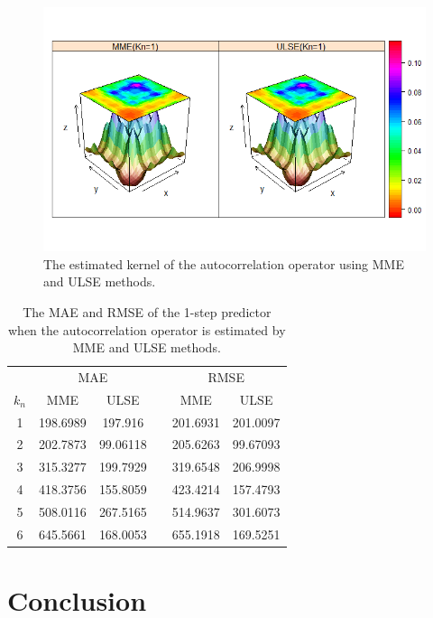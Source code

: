 \documentclass[11pt,a4paper]{article}
\numberwithin{equation}{section}
\begin{document}
\begin{figure}
\centering
\includegraphics[width=\textwidth]{images/kernel_Flinders.png}
\caption{The estimated kernel of the autocorrelation operator using MME and ULSE methods.
\label{fig:pedestrian kernel}}
\end{figure}

\begin{table}
\centering
\begin{tabular}{cccccc}
\hline\hline
&\multicolumn{2}{c}{MAE}&&\multicolumn{2}{c}{RMSE}\\ \cline{2-3}\cline{5-6}
$k_n$&MME&ULSE&&MME&ULSE\\ \hline
1&	198.6989&	197.916	&&	201.6931&	201.0097\\
2&	202.7873&	99.06118&&		205.6263	&99.67093\\
3&	315.3277&	199.7929&&		319.6548&	206.9998\\
4&	418.3756&	155.8059&&		423.4214	&157.4793\\
5&	508.0116&	267.5165&&		514.9637	&301.6073\\
6&	645.5661&	168.0053&&		655.1918	&169.5251\\ \hline

\end{tabular}
\caption{The MAE and RMSE of the 1-step predictor when the autocorrelation operator is estimated by MME and ULSE methods. \label{tab: pred}}
\end{table}

\section{Conclusion}\label{sec:conclusion}
\end{document}
